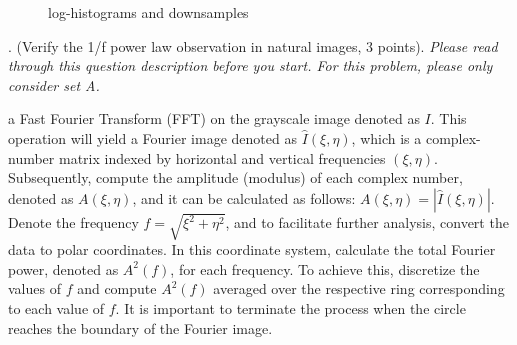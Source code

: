 \documentclass[11pt]{article}
\begin{document}
\begin{enumerate}
\begin{figure}[h]
{    }
    \caption{log-histograms and downsamples}
\end{figure}

\end{enumerate}

\clearpage

. (Verify the 1/f power law observation in natural images, 3 points). \emph{Please read through this question description before you start. For this problem, please only consider set A.}

 a Fast Fourier Transform (FFT) on the grayscale image denoted as $I$. This operation will yield a Fourier image denoted as $\hat I(\xi, \eta)$, which is a complex-number matrix indexed by horizontal and vertical frequencies $(\xi, \eta)$. Subsequently, compute the amplitude (modulus) of each complex number, denoted as $A(\xi, \eta)$, and it can be calculated as follows: $A(\xi, \eta) = |\hat I(\xi, \eta)|$. Denote the frequency $f=\sqrt{\xi^2 + \eta^2}$, and to facilitate further analysis, convert the data to polar coordinates. In this coordinate system, calculate the total Fourier power, denoted as $A^2(f)$, for each frequency. To achieve this, discretize the values of $f$ and compute $A^2(f)$ averaged over the respective ring corresponding to each value of $f$. It is important to terminate the process when the circle reaches the boundary of the Fourier image.
\end{document}
